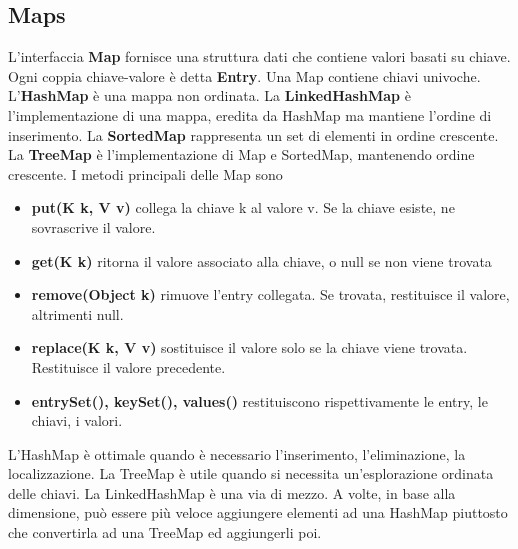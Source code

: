 \documentclass[11pt]{article}
\begin{document}
 \subsection{Maps}
L'interfaccia \textbf{Map} fornisce una struttura dati che contiene valori basati su chiave. Ogni coppia chiave-valore è detta \textbf{Entry}. Una Map contiene chiavi univoche. L'\textbf{HashMap} è una mappa non ordinata. La \textbf{LinkedHashMap} è l'implementazione di una mappa, eredita da HashMap ma mantiene l'ordine di inserimento. La \textbf{SortedMap} rappresenta un set di elementi in ordine crescente. La \textbf{TreeMap} è l'implementazione di Map e SortedMap, mantenendo ordine crescente. I metodi principali delle Map sono 
\begin{itemize}
    \item \textbf{put(K k, V v)} collega la chiave k al valore v. Se la chiave esiste, ne sovrascrive il valore.
    \item \textbf{get(K k)} ritorna il valore associato alla chiave, o null se non viene trovata
    \item \textbf{remove(Object k)} rimuove l'entry collegata. Se trovata, restituisce il valore, altrimenti null.
    \item \textbf{replace(K k, V v)} sostituisce il valore solo se la chiave viene trovata. Restituisce il valore precedente.
    \item \textbf{entrySet(), keySet(), values()} restituiscono rispettivamente le entry, le chiavi, i valori.
\end{itemize}
L'HashMap è ottimale quando è necessario l'inserimento, l'eliminazione, la localizzazione. La TreeMap è utile quando si necessita un'esplorazione ordinata delle chiavi. La LinkedHashMap è una via di mezzo. A volte, in base alla dimensione, può essere più veloce aggiungere elementi ad una HashMap piuttosto che convertirla ad una TreeMap ed aggiungerli poi.
\end{document}
